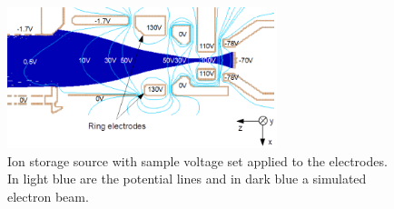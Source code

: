		\begin{figure}[h]
			\centering
			\includegraphics[width = 0.7\textwidth]{Experiments/FiL_IS_elBeam_Storage.png}
			\caption{Ion storage source with sample voltage set applied to the electrodes. In light blue are the potential lines and in dark blue a simulated electron beam.}
			\label{fig:ExpFSFlightSenIonStorIS}
		\end{figure}
